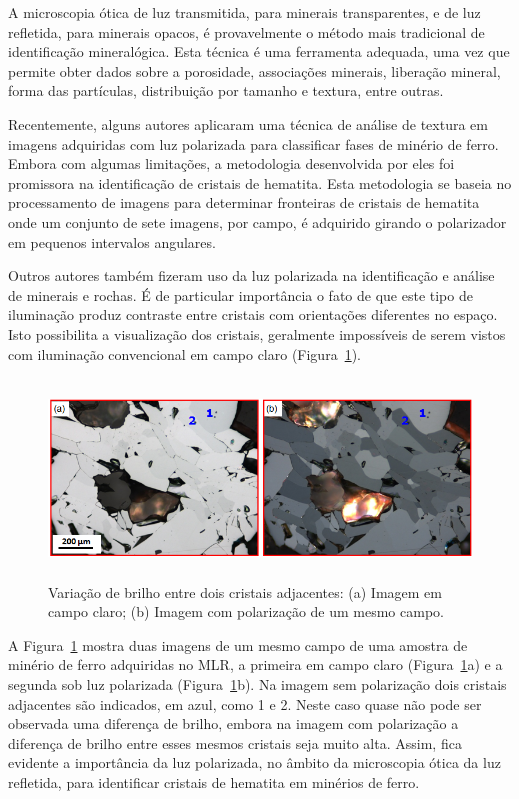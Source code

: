 A microscopia ótica de luz transmitida, para minerais transparentes, e
de luz refletida, para minerais opacos, é provavelmente o método mais
tradicional de identificação mineralógica.\cite{60} Esta técnica é uma
ferramenta adequada, uma vez que permite obter dados sobre a
porosidade, associações minerais, liberação mineral, forma das
partículas, distribuição por tamanho e textura, entre outras.\cite{30}

Recentemente, alguns autores aplicaram uma técnica de análise de
textura em imagens adquiridas com luz polarizada para classificar
fases de minério de ferro.\cite{58} Embora com algumas limitações, a
metodologia desenvolvida por eles foi promissora na identificação de
cristais de hematita. Esta metodologia se baseia no processamento de
imagens para determinar fronteiras de cristais de hematita onde um
conjunto de sete imagens, por campo, é adquirido girando o polarizador
em pequenos intervalos angulares.

Outros autores também fizeram uso da luz polarizada na identificação e
análise de minerais e rochas.\cite{30,61,62,63,64} É de particular
importância o fato de que este tipo de iluminação produz contraste
entre cristais com orientações diferentes no espaço. Isto possibilita
a visualização dos cristais, geralmente impossíveis de serem vistos
com iluminação convencional em campo claro (Figura~\ref{fig:bf-pol}).

\begin{figure} [h]
  \begin{center}
    \includegraphics[height=150pt,width=400pt]{images/fig_bf-pol}
    \caption{Variação de brilho entre dois cristais adjacentes: (a)
      Imagem em campo claro; (b) Imagem com polarização de um mesmo
      campo.\cite{65}}\label{fig:bf-pol}
  \end{center}
\end{figure}

A Figura~\ref{fig:bf-pol} mostra duas imagens de um mesmo campo de uma
amostra de minério de ferro adquiridas no MLR, a primeira em campo
claro (Figura~\ref{fig:bf-pol}a) e a segunda sob luz polarizada
(Figura~\ref{fig:bf-pol}b). Na imagem sem polarização dois cristais
adjacentes são indicados, em azul, como 1 e 2.  Neste caso quase não
pode ser observada uma diferença de brilho, embora na imagem com
polarização a diferença de brilho entre esses mesmos cristais seja
muito alta. Assim, fica evidente a importância da luz polarizada, no
âmbito da microscopia ótica da luz refletida, para identificar
cristais de hematita em minérios de ferro.


